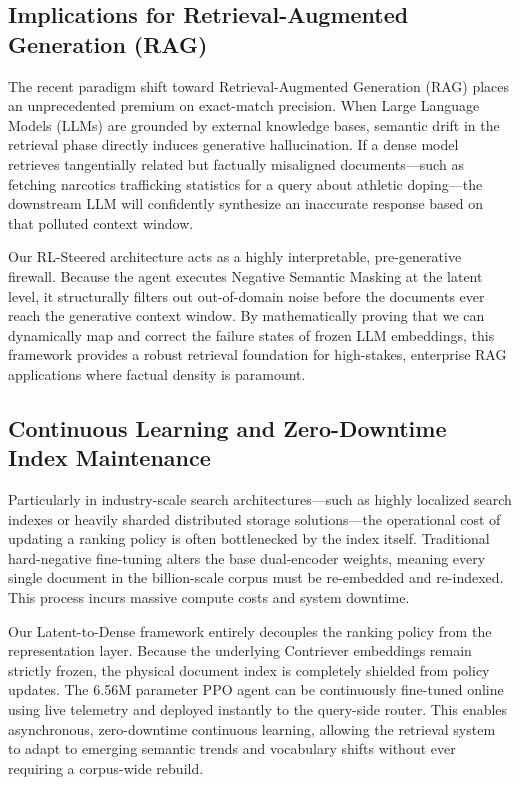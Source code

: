 \subsection{Implications for Retrieval-Augmented Generation (RAG)}
The recent paradigm shift toward Retrieval-Augmented Generation (RAG) places an unprecedented premium on exact-match precision. When Large Language Models (LLMs) are grounded by external knowledge bases, semantic drift in the retrieval phase directly induces generative hallucination. If a dense model retrieves tangentially related but factually misaligned documents—such as fetching narcotics trafficking statistics for a query about athletic doping—the downstream LLM will confidently synthesize an inaccurate response based on that polluted context window.

Our RL-Steered architecture acts as a highly interpretable, pre-generative firewall. Because the agent executes Negative Semantic Masking at the latent level, it structurally filters out out-of-domain noise before the documents ever reach the generative context window. By mathematically proving that we can dynamically map and correct the failure states of frozen LLM embeddings, this framework provides a robust retrieval foundation for high-stakes, enterprise RAG applications where factual density is paramount.

\subsection{Continuous Learning and Zero-Downtime Index Maintenance}
Particularly in industry-scale search architectures—such as highly localized search indexes or heavily sharded distributed storage solutions—the operational cost of updating a ranking policy is often bottlenecked by the index itself. Traditional hard-negative fine-tuning alters the base dual-encoder weights, meaning every single document in the billion-scale corpus must be re-embedded and re-indexed. This process incurs massive compute costs and system downtime.

Our Latent-to-Dense framework entirely decouples the ranking policy from the representation layer. Because the underlying Contriever embeddings remain strictly frozen, the physical document index is completely shielded from policy updates. The 6.56M parameter PPO agent can be continuously fine-tuned online using live telemetry and deployed instantly to the query-side router. This enables asynchronous, zero-downtime continuous learning, allowing the retrieval system to adapt to emerging semantic trends and vocabulary shifts without ever requiring a corpus-wide rebuild.

